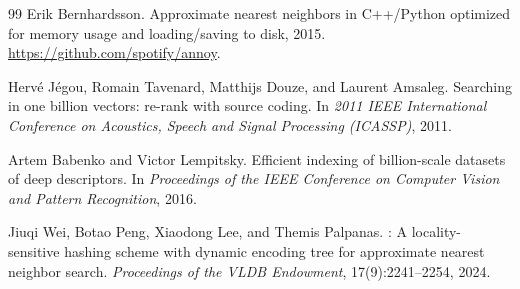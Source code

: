 \documentclass[11pt,a4paper]{article}
\begin{document}
\begin{thebibliography}{99}
Erik Bernhardsson.
\newblock Approximate nearest neighbors in {C++/Python} optimized for memory
  usage and loading/saving to disk, 2015.
\newblock \url{https://github.com/spotify/annoy}.

Herv{\'e} J{\'e}gou, Romain Tavenard, Matthijs Douze, and Laurent Amsaleg.
\newblock Searching in one billion vectors: re-rank with source coding.
\newblock In \emph{2011 IEEE International Conference on Acoustics, Speech and
  Signal Processing (ICASSP)}, 2011.

Artem Babenko and Victor Lempitsky.
\newblock Efficient indexing of billion-scale datasets of deep descriptors.
\newblock In \emph{Proceedings of the IEEE Conference on Computer Vision and
  Pattern Recognition}, 2016.

Jiuqi Wei, Botao Peng, Xiaodong Lee, and Themis Palpanas.
: A locality-sensitive hashing scheme with dynamic encoding
  tree for approximate nearest neighbor search.
\newblock \emph{Proceedings of the VLDB Endowment}, 17(9):2241--2254, 2024.

\end{thebibliography}
\end{document}

